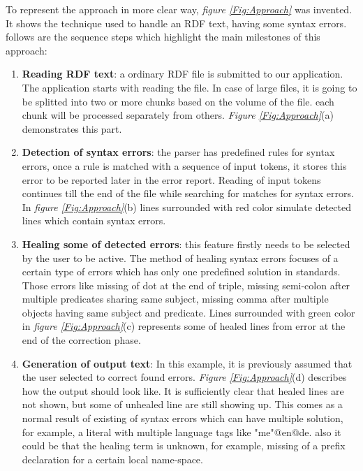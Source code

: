  To represent the approach in more clear way, {\it figure \ref{Fig:Approach}} was invented. It shows the technique used to handle an RDF text, having some syntax errors. follows are the sequence steps which highlight the main milestones of this approach:
 \begin{enumerate}[label=(\alph*)]
\item \textbf{Reading RDF text}: a ordinary RDF file is submitted to our application. The application starts with reading the file. In case of large files, it is going to be splitted into two or more chunks based on the volume of the file. each chunk will be processed separately from others.  {\it Figure \ref{Fig:Approach}}(a) demonstrates this part. 
\item \textbf{Detection of syntax errors}: the parser has predefined rules for syntax errors, once a rule is matched with a sequence of input tokens, it stores this error to be reported later in the error report. Reading of input tokens continues till the end of the file while searching for matches for syntax errors. In  {\it figure \ref{Fig:Approach}}(b) lines surrounded with red color simulate detected lines which contain syntax errors. 
\item \textbf {Healing some of detected errors}: this feature firstly needs to be selected by the user to be active. The method of healing syntax errors focuses of a certain type of errors which has only one predefined solution in standards. Those errors like missing of dot at the end of triple, missing semi-colon after multiple predicates sharing same subject, missing comma after multiple objects having same subject and predicate. Lines surrounded with green color in {\it figure \ref{Fig:Approach}}(c) represents some of healed lines from error at the end of the correction phase.  
\item\textbf {Generation of output text}: In this example, it is previously assumed that the user selected to correct found errors.  {\it Figure \ref{Fig:Approach}}(d) describes how the output should look like. It is sufficiently clear that healed lines are not shown, but some of unhealed line are still showing up. This comes as a normal result of existing of syntax errors which can have multiple solution, for example, a literal with multiple language tags like "me"@en@de. also it could be that the healing term is unknown, for example, missing of a prefix declaration for a certain local name-space. 
\end{enumerate} 
